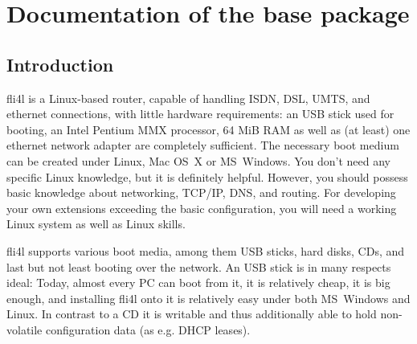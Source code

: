 \chapter{Documentation of the base package}

\section{Introduction}

fli4l is a Linux-based router, capable of handling ISDN, DSL, UMTS, and
ethernet connections, with little hardware requirements: an USB stick used for
booting, an Intel Pentium MMX processor, 64 MiB RAM as well as (at least) one
ethernet network adapter are completely sufficient. The necessary boot medium
can be created under Linux, Mac OS~X or MS~Windows. You don't need any specific Linux
knowledge, but it is definitely helpful. However, you should possess basic
knowledge about networking, TCP/IP, DNS, and routing. For developing your own
extensions exceeding the basic configuration, you will need a working Linux
system as well as Linux skills.

fli4l supports various boot media, among them USB sticks, hard disks, CDs, and
last but not least booting over the network. An USB stick is in many respects
ideal:  Today, almost every PC can boot from it, it is relatively cheap, it is
big enough, and installing fli4l onto it is relatively easy under both
MS~Windows and Linux. In contrast to a CD it is writable and thus additionally
able to hold non-volatile configuration data (as e.g. DHCP leases).

